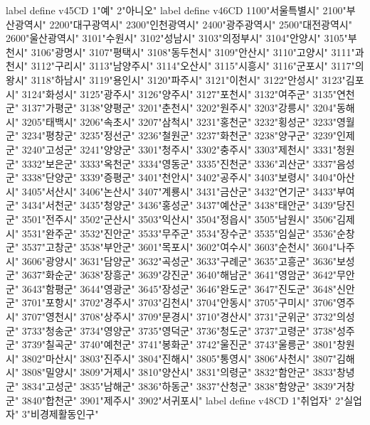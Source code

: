        label define v45CD 1"예" 2"아니오"
        label define v46CD 1100"서울특별시" 2100"부산광역시" 2200"대구광역시" 2300"인천광역시" 2400"광주광역시" 2500"대전광역시" 2600"울산광역시" 3101"수원시" 3102"성남시" 3103"의정부시" 3104"안양시" 3105"부천시" 3106"광명시" 3107"평택시" 3108"동두천시" 3109"안산시" 3110"고양시" 3111"과천시" 3112"구리시" 3113"남양주시" 3114"오산시" 3115"시흥시" 3116"군포시" 3117"의왕시" 3118"하남시" 3119"용인시" 3120"파주시" 3121"이천시" 3122"안성시" 3123"김포시" 3124"화성시" 3125"광주시" 3126"양주시" 3127"포천시" 3132"여주군" 3135"연천군" 3137"가평군" 3138"양평군" 3201"춘천시" 3202"원주시" 3203"강릉시" 3204"동해시" 3205"태백시" 3206"속초시" 3207"삼척시" 3231"홍천군" 3232"횡성군" 3233"영월군" 3234"평창군" 3235"정선군" 3236"철원군" 3237"화천군" 3238"양구군" 3239"인제군" 3240"고성군" 3241"양양군" 3301"청주시" 3302"충주시" 3303"제천시" 3331"청원군" 3332"보은군" 3333"옥천군" 3334"영동군" 3335"진천군" 3336"괴산군" 3337"음성군" 3338"단양군" 3339"증평군" 3401"천안시" 3402"공주시" 3403"보령시" 3404"아산시" 3405"서산시" 3406"논산시" 3407"계룡시" 3431"금산군" 3432"연기군" 3433"부여군" 3434"서천군" 3435"청양군" 3436"홍성군" 3437"예산군" 3438"태안군" 3439"당진군" 3501"전주시" 3502"군산시" 3503"익산시" 3504"정읍시" 3505"남원시" 3506"김제시" 3531"완주군" 3532"진안군" 3533"무주군" 3534"장수군" 3535"임실군" 3536"순창군" 3537"고창군" 3538"부안군" 3601"목포시" 3602"여수시" 3603"순천시" 3604"나주시" 3606"광양시" 3631"담양군" 3632"곡성군" 3633"구례군" 3635"고흥군" 3636"보성군" 3637"화순군" 3638"장흥군" 3639"강진군" 3640"해남군" 3641"영암군" 3642"무안군" 3643"함평군" 3644"영광군" 3645"장성군" 3646"완도군" 3647"진도군" 3648"신안군" 3701"포항시" 3702"경주시" 3703"김천시" 3704"안동시" 3705"구미시" 3706"영주시" 3707"영천시" 3708"상주시" 3709"문경시" 3710"경산시" 3731"군위군" 3732"의성군" 3733"청송군" 3734"영양군" 3735"영덕군" 3736"청도군" 3737"고령군" 3738"성주군" 3739"칠곡군" 3740"예천군" 3741"봉화군" 3742"울진군" 3743"울릉군" 3801"창원시" 3802"마산시" 3803"진주시" 3804"진해시" 3805"통영시" 3806"사천시" 3807"김해시" 3808"밀양시" 3809"거제시" 3810"양산시" 3831"의령군" 3832"함안군" 3833"창녕군" 3834"고성군" 3835"남해군" 3836"하동군" 3837"산청군" 3838"함양군" 3839"거창군" 3840"합천군" 3901"제주시" 3902"서귀포시"
        label define v48CD 1"취업자" 2"실업자" 3"비경제활동인구"

